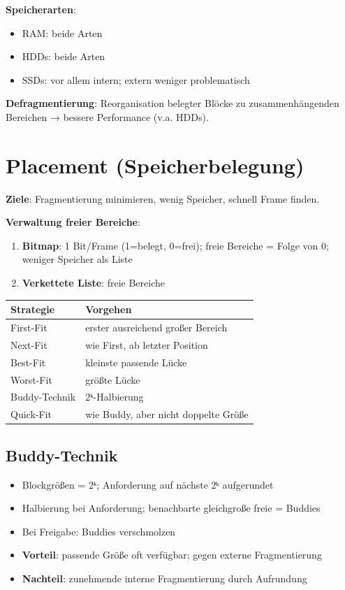 \documentclass[11pt, a4paper]{article}
\begin{document}
\textbf{Speicherarten}:

\begin{itemize}
  \item RAM: beide Arten
  \item HDDs: beide Arten
  \item SSDs: vor allem intern; extern weniger problematisch
\end{itemize}

\textbf{Defragmentierung}: Reorganisation belegter Blöcke zu zusammenhängenden Bereichen → bessere Performance (v.a. HDDs).



\section{Placement (Speicherbelegung)}

\textbf{Ziele}: Fragmentierung minimieren, wenig Speicher, schnell Frame finden.


\textbf{Verwaltung freier Bereiche}:

\begin{enumerate}
  \item \textbf{Bitmap}: 1 Bit/Frame (1=belegt, 0=frei); freie Bereiche = Folge von 0; weniger Speicher als Liste
  \item \textbf{Verkettete Liste}: freie Bereiche
\end{enumerate}


{\small
\begin{tabularx}{\linewidth}{XX}
\hline
\rowcolor{tableheadbg}
{\color{white}\textbf{Strategie}} & {\color{white}\textbf{Vorgehen}} \\[2pt]
\hline
\endhead
\hline
\endfoot
First-Fit & erster ausreichend großer Bereich \\
Next-Fit & wie First, ab letzter Position \\
Best-Fit & kleinste passende Lücke \\
Worst-Fit & größte Lücke \\
Buddy-Technik & 2ᵏ-Halbierung \\
Quick-Fit & wie Buddy, aber nicht doppelte Größe \\
\end{tabularx}
}



\subsection{Buddy-Technik}
\begin{itemize}
  \item Blockgrößen = 2ᵏ; Anforderung auf nächste 2ᵏ aufgerundet
  \item Halbierung bei Anforderung; benachbarte gleichgroße freie = Buddies
  \item Bei Freigabe: Buddies verschmolzen
  \item \textbf{Vorteil}: passende Größe oft verfügbar; gegen externe Fragmentierung
  \item \textbf{Nachteil}: zunehmende interne Fragmentierung durch Aufrundung
\end{itemize}
\end{document}
